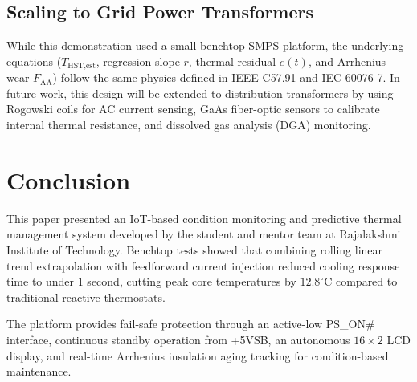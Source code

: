 \documentclass[conference]{IEEEtran}
\begin{document}
\subsection{Scaling to Grid Power Transformers}
While this demonstration used a small benchtop SMPS platform, the underlying equations ($T_{\text{HST,est}}$, regression slope $r$, thermal residual $e(t)$, and Arrhenius wear $F_{\text{AA}}$) follow the same physics defined in IEEE C57.91 and IEC 60076-7. In future work, this design will be extended to distribution transformers by using Rogowski coils for AC current sensing, GaAs fiber-optic sensors to calibrate internal thermal resistance, and dissolved gas analysis (DGA) monitoring.

\section{Conclusion}
This paper presented an IoT-based condition monitoring and predictive thermal management system developed by the student and mentor team at Rajalakshmi Institute of Technology. Benchtop tests showed that combining rolling linear trend extrapolation with feedforward current injection reduced cooling response time to under 1 second, cutting peak core temperatures by $12.8^\circ\text{C}$ compared to traditional reactive thermostats.

The platform provides fail-safe protection through an active-low PS\_ON\# interface, continuous standby operation from +5VSB, an autonomous $16\times2$ LCD display, and real-time Arrhenius insulation aging tracking for condition-based maintenance.
\end{document}
